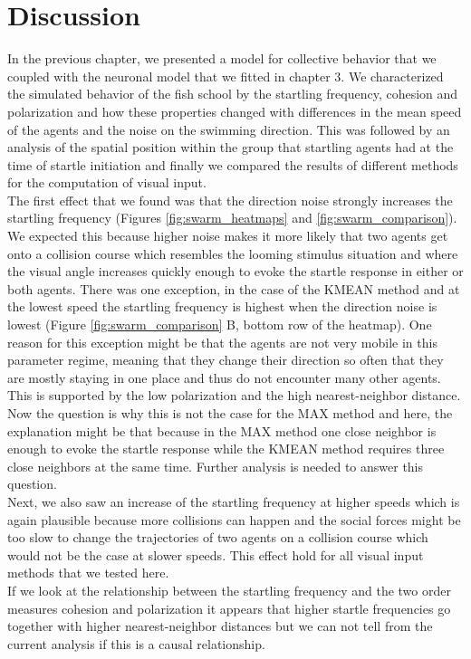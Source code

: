 \chapter{Discussion}
    In the previous chapter, we presented a model for collective behavior that we coupled with the neuronal model that we fitted in chapter 3.
    We characterized the simulated behavior of the fish school by the startling frequency, cohesion and polarization and how these properties changed with differences in the mean speed of the agents and the noise on the swimming direction.
    This was followed by an analysis of the spatial position within the group that startling agents had at the time of startle initiation and finally we compared the results of different methods for the computation of visual input.\\
    The first effect that we found was that the direction noise strongly increases the startling frequency (Figures \ref{fig:swarm_heatmaps} and \ref{fig:swarm_comparison}).
    We expected this because higher noise makes it more likely that two agents get onto a collision course which resembles the looming stimulus situation and where the visual angle increases quickly enough to evoke the startle response in either or both agents.
    There was one exception, in the case of the KMEAN method and at the lowest speed the startling frequency is highest when the direction noise is lowest (Figure \ref{fig:swarm_comparison} B, bottom row of the heatmap).
    One reason for this exception might be that the agents are not very mobile in this parameter regime, meaning that they change their direction so often that they are mostly staying in one place and thus do not encounter many other agents.
    This is supported by the low polarization and the high nearest-neighbor distance.
    Now the question is why this is not the case for the MAX method and here, the explanation might be that because in the MAX method one close neighbor is enough to evoke the startle response while the KMEAN method requires three close neighbors at the same time.
    Further analysis is needed to answer this question.\\
    Next, we also saw an increase of the startling frequency at higher speeds which is again plausible because more collisions can happen and the social forces might be too slow to change the trajectories of two agents on a collision course which would not be the case at slower speeds.
    This effect hold for all visual input methods that we tested here.\\
    If we look at the relationship between the startling frequency and the two order measures cohesion and polarization it appears that higher startle frequencies go together with higher nearest-neighbor distances but we can not tell from the current analysis if this is a causal relationship.
